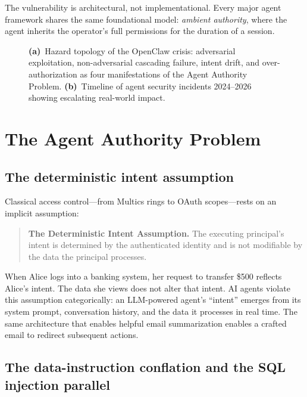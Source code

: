 \documentclass[pdflatex,sn-nature]{sn-jnl}%
\theoremstyle{thmstyleone}%
\theoremstyle{thmstyletwo}%
\theoremstyle{thmstylethree}%
\begin{document}
The vulnerability is architectural, not implementational. Every major agent framework shares the same foundational model: \emph{ambient authority}, where the agent inherits the operator's full permissions for the duration of a session.

\begin{figure}[ht]
\centering
\caption{\textbf{(a)}~Hazard topology of the OpenClaw crisis: adversarial exploitation, non-adversarial cascading failure, intent drift, and over-authorization as four manifestations of the Agent Authority Problem. \textbf{(b)}~Timeline of agent security incidents 2024--2026 showing escalating real-world impact.}
\label{fig:hazard}
\end{figure}

\section{The Agent Authority Problem}\label{sec:aap}

\subsection{The deterministic intent assumption}\label{subsec:intent}

Classical access control---from Multics rings to OAuth scopes---rests on an implicit assumption:

\begin{quote}
\textbf{The Deterministic Intent Assumption.} The executing principal's intent is determined by the authenticated identity and is not modifiable by the data the principal processes.
\end{quote}

When Alice logs into a banking system, her request to transfer \$500 reflects Alice's intent. The data she views does not alter that intent. AI agents violate this assumption categorically: an LLM-powered agent's ``intent'' emerges from its system prompt, conversation history, and the data it processes in real time. The same architecture that enables helpful email summarization enables a crafted email to redirect subsequent actions.

\subsection{The data-instruction conflation and the SQL injection parallel}\label{subsec:sql}
\end{document}
